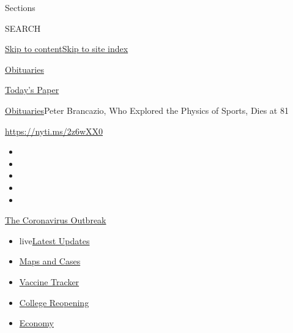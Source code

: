 Sections

SEARCH

\protect\hyperlink{site-content}{Skip to
content}\protect\hyperlink{site-index}{Skip to site index}

\href{https://www.nytimes3xbfgragh.onion/section/obituaries}{Obituaries}

\href{https://myaccount.nytimes3xbfgragh.onion/auth/login?response_type=cookie\&client_id=vi}{}

\href{https://www.nytimes3xbfgragh.onion/section/todayspaper}{Today's
Paper}

\href{/section/obituaries}{Obituaries}\textbar{}Peter Brancazio, Who
Explored the Physics of Sports, Dies at 81

\url{https://nyti.ms/2z6wXX0}

\begin{itemize}
\item
\item
\item
\item
\item
\end{itemize}

\href{https://www.nytimes3xbfgragh.onion/news-event/coronavirus?action=click\&pgtype=Article\&state=default\&region=TOP_BANNER\&context=storylines_menu}{The
Coronavirus Outbreak}

\begin{itemize}
\tightlist
\item
  live\href{https://www.nytimes3xbfgragh.onion/2020/08/04/world/coronavirus-covid-19.html?action=click\&pgtype=Article\&state=default\&region=TOP_BANNER\&context=storylines_menu}{Latest
  Updates}
\item
  \href{https://www.nytimes3xbfgragh.onion/interactive/2020/us/coronavirus-us-cases.html?action=click\&pgtype=Article\&state=default\&region=TOP_BANNER\&context=storylines_menu}{Maps
  and Cases}
\item
  \href{https://www.nytimes3xbfgragh.onion/interactive/2020/science/coronavirus-vaccine-tracker.html?action=click\&pgtype=Article\&state=default\&region=TOP_BANNER\&context=storylines_menu}{Vaccine
  Tracker}
\item
  \href{https://www.nytimes3xbfgragh.onion/2020/08/02/us/covid-college-reopening.html?action=click\&pgtype=Article\&state=default\&region=TOP_BANNER\&context=storylines_menu}{College
  Reopening}
\item
  \href{https://www.nytimes3xbfgragh.onion/live/2020/08/03/business/stock-market-today-coronavirus?action=click\&pgtype=Article\&state=default\&region=TOP_BANNER\&context=storylines_menu}{Economy}
\end{itemize}

